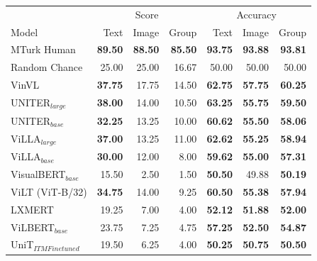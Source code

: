 \begin{table}[ht]
\centering
\begin{adjustbox}{max width=0.6\textwidth}
\begin{tabular}{l|rrr|rrr}
\toprule
 &
  \multicolumn{3}{c|}{{Score}} &
  \multicolumn{3}{c}{{Accuracy}} \\
 Model                               & Text           & Image          & Group          & Text       & Image      & Group      \\
\midrule
 MTurk Human                         & \textbf{89.50} & \textbf{88.50} & \textbf{85.50} & \textbf{93.75} & \textbf{93.88} & \textbf{93.81} \\
 Random Chance                       & 25.00          & 25.00          & 16.67          & 50.00          & 50.00          & 50.00          \\
 \midrule
 VinVL                        & \textbf{37.75} & 17.75          & 14.50          & \textbf{62.75} & \textbf{57.75} & \textbf{60.25} \\
 UNITER$_{large}$             & \textbf{38.00} & 14.00          & 10.50          & \textbf{63.25} & \textbf{55.75} & \textbf{59.50} \\
 UNITER$_{base}$              & \textbf{32.25} & 13.25          & 10.00          & \textbf{60.62} & \textbf{55.50} & \textbf{58.06} \\
 ViLLA$_{large}$              & \textbf{37.00} & 13.25          & 11.00          & \textbf{62.62} & \textbf{55.25} & \textbf{58.94} \\
 ViLLA$_{base}$               & \textbf{30.00} & 12.00          & 8.00           & \textbf{59.62} & \textbf{55.00} & \textbf{57.31} \\
 VisualBERT$_{base}$          & 15.50          & 2.50           & 1.50           & \textbf{50.50} & 49.88          & \textbf{50.19} \\
 ViLT (ViT-B/32)              & \textbf{34.75} & 14.00          & 9.25           & \textbf{60.50} & \textbf{55.38} & \textbf{57.94} \\
 LXMERT                       & 19.25          & 7.00           & 4.00           & \textbf{52.12} & \textbf{51.88} & \textbf{52.00} \\
 ViLBERT$_{base}$             & 23.75          & 7.25           & 4.75           & \textbf{57.25} & \textbf{52.50} & \textbf{54.87} \\
 UniT$_{ITM Finetuned}$       & 19.50          & 6.25           & 4.00           & \textbf{50.25} & \textbf{50.75} & \textbf{50.50} \\

\end{tabular}
\end{adjustbox}
\end{table}

